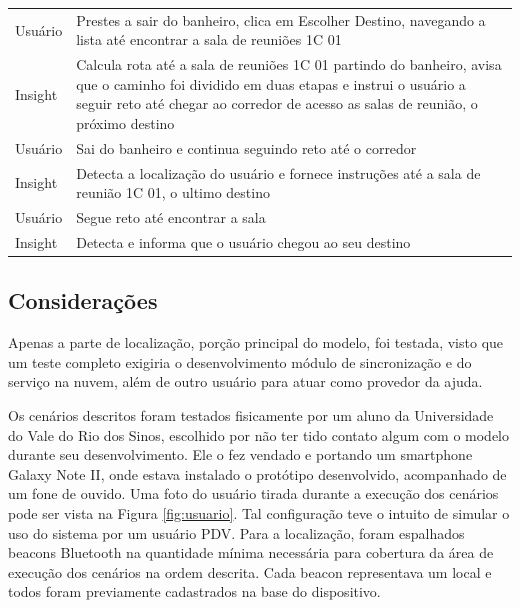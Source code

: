 \documentclass[twoside,english,brazilian]{UNISINOSartigo}
\begin{document}
\begin{table}
\begin{minipage}{0.9\textwidth}
\begin{adjustbox}{max width=\textwidth}
\begin{tabular}{ p{} | p{14cm} }
Usuário & Prestes a sair do banheiro, clica em Escolher Destino, navegando a lista até encontrar a sala de reuniões 1C 01 \\
Insight & Calcula rota até a sala de reuniões 1C 01 partindo do banheiro, avisa que o caminho foi dividido em duas etapas e instrui o usuário a seguir reto até chegar ao corredor de acesso as salas de reunião, o próximo destino \\
Usuário & Sai do banheiro e continua seguindo reto até o corredor \\
Insight & Detecta a localização do usuário e fornece instruções até a sala de reunião 1C 01, o ultimo destino \\
Usuário & Segue reto até encontrar a sala \\
Insight & Detecta e informa que o usuário chegou ao seu destino \\
\hline
			\end{tabular}
		\end{adjustbox}
	\end{minipage}
\end{table}

\FloatBarrier
\subsection{Considerações}\label{sec:consideracoes}
Apenas a parte de localização, porção principal do modelo, foi testada, visto que um teste completo exigiria o desenvolvimento módulo de sincronização e do serviço na nuvem, além de outro usuário para atuar como provedor da ajuda.

Os cenários descritos foram testados fisicamente por um aluno da Universidade do Vale do Rio dos Sinos, escolhido por não ter tido contato algum com o modelo durante seu desenvolvimento. Ele o fez vendado e portando um smartphone Galaxy Note II, onde estava instalado o protótipo desenvolvido, acompanhado de um fone de ouvido. Uma foto do usuário tirada durante a execução dos cenários pode ser vista na Figura \ref{fig:usuario}. Tal configuração teve o intuito de simular o uso do sistema por um usuário PDV. Para a localização, foram espalhados beacons Bluetooth na quantidade mínima necessária para cobertura da área de execução dos cenários na ordem descrita. Cada beacon representava um local e todos foram previamente cadastrados na base do dispositivo. 
\end{document}

